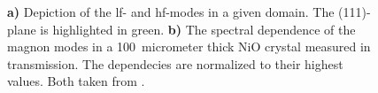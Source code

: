 \begin{figure}[ht]
\begin{subfigure}[c]{0.45\textwidth}
        \caption{}
        \label{fig:7}
    \end{subfigure}
    \vspace{-0.3cm}
    \caption{\textbf{a)} Depiction of the lf- and hf-modes in a given domain. The (111)-plane is highlighted in green. \textbf{b)} The spectral dependence of the magnon modes in a \qty{100}{micrometer} thick NiO crystal measured in transmission. The dependecies are normalized to their highest values. Both taken from .}
\end{figure}

